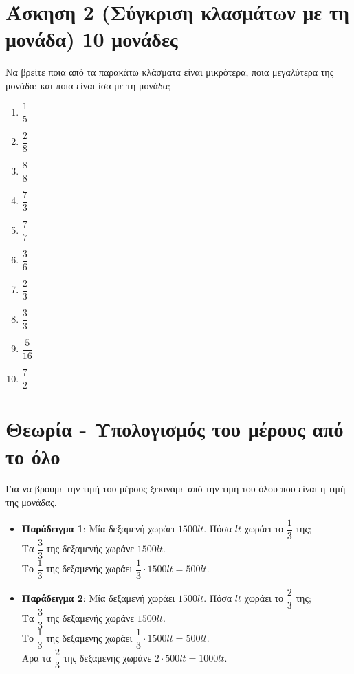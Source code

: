 \documentclass[a4paper,10pt]{report}
\begin{document}
\section*{Άσκηση 2 (Σύγκριση κλασμάτων με τη μονάδα) \hfill \small{10 μονάδες}}
Να βρείτε ποια από τα παρακάτω κλάσματα είναι μικρότερα, ποια μεγαλύτερα της μονάδα; και ποια είναι ίσα με τη μονάδα;
\begin{enumerate}[1)]
 \item $\dfrac{1}{5}$
 \item $\dfrac{2}{8}$
 \item $\dfrac{8}{8}$
 \item $\dfrac{7}{3}$
 \item $\dfrac{7}{7}$
 \item $\dfrac{3}{6}$
 \item $\dfrac{2}{3}$
 \item $\dfrac{3}{3}$
 \item $\dfrac{5}{16}$
 \item $\dfrac{7}{2}$
\end{enumerate}

\section*{Θεωρία - Υπολογισμός του μέρους από το όλο \hfill \small{}}
Για να βρούμε την τιμή του μέρους ξεκινάμε από την τιμή του όλου που είναι η τιμή της μονάδας.
\begin{itemize}
 \item \textbf{Παράδειγμα 1}: Μία δεξαμενή χωράει $1500lt$. Πόσα $lt$ χωράει το $\dfrac{1}{3}$ της;\\
       Τα $\dfrac{3}{3}$ της δεξαμενής χωράνε $1500lt$.\\
       Το $\dfrac{1}{3}$ της δεξαμενής χωράει $\dfrac{1}{3}\cdot 1500lt=500lt$.\\
 \item \textbf{Παράδειγμα 2}: Μία δεξαμενή χωράει $1500lt$. Πόσα $lt$ χωράει το $\dfrac{2}{3}$ της;\\
       Τα $\dfrac{3}{3}$ της δεξαμενής χωράνε $1500lt$.\\
       Το $\dfrac{1}{3}$ της δεξαμενής χωράει $\dfrac{1}{3}\cdot 1500lt=500lt$.\\
       Άρα τα $\dfrac{2}{3}$ της δεξαμενής χωράνε $2\cdot 500lt=1000lt$.
\end{itemize}
\end{document}
